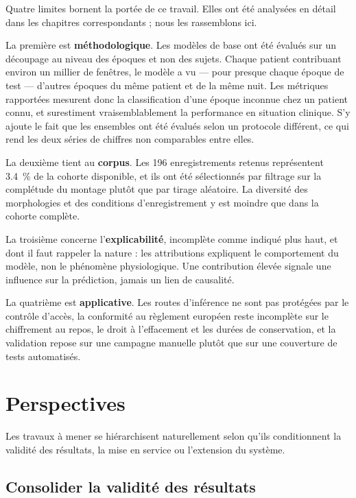 Quatre limites bornent la portée de ce travail. Elles ont été analysées en détail dans
les chapitres correspondants ; nous les rassemblons ici.

La première est \textbf{méthodologique}. Les modèles de base ont été évalués sur un
découpage au niveau des époques et non des sujets. Chaque patient contribuant environ un
millier de fenêtres, le modèle a vu — pour presque chaque époque de test — d'autres
époques du même patient et de la même nuit. Les métriques rapportées mesurent donc la
classification d'une époque inconnue chez un patient connu, et surestiment
vraisemblablement la performance en situation clinique. S'y ajoute le fait que les
ensembles ont été évalués selon un protocole différent, ce qui rend les deux séries de
chiffres non comparables entre elles.

La deuxième tient au \textbf{corpus}. Les 196 enregistrements retenus représentent
\SI{3,4}{\percent} de la cohorte disponible, et ils ont été sélectionnés par filtrage
sur la complétude du montage plutôt que par tirage aléatoire. La diversité des
morphologies et des conditions d'enregistrement y est moindre que dans la cohorte
complète.

La troisième concerne l'\textbf{explicabilité}, incomplète comme indiqué plus haut, et
dont il faut rappeler la nature : les attributions expliquent le comportement du
modèle, non le phénomène physiologique. Une contribution élevée signale une influence
sur la prédiction, jamais un lien de causalité.

La quatrième est \textbf{applicative}. Les routes d'inférence ne sont pas protégées par
le contrôle d'accès, la conformité au règlement européen reste incomplète sur le
chiffrement au repos, le droit à l'effacement et les durées de conservation, et la
validation repose sur une campagne manuelle plutôt que sur une couverture de tests
automatisés.

\section*{Perspectives}

Les travaux à mener se hiérarchisent naturellement selon qu'ils conditionnent la
validité des résultats, la mise en service ou l'extension du système.

\subsection*{Consolider la validité des résultats}

